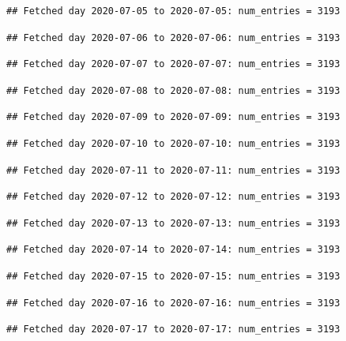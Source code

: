 \documentclass[]{article}
\begin{document}
\begin{verbatim}
## Fetched day 2020-07-05 to 2020-07-05: num_entries = 3193
\end{verbatim}

\begin{verbatim}
## Fetched day 2020-07-06 to 2020-07-06: num_entries = 3193
\end{verbatim}

\begin{verbatim}
## Fetched day 2020-07-07 to 2020-07-07: num_entries = 3193
\end{verbatim}

\begin{verbatim}
## Fetched day 2020-07-08 to 2020-07-08: num_entries = 3193
\end{verbatim}

\begin{verbatim}
## Fetched day 2020-07-09 to 2020-07-09: num_entries = 3193
\end{verbatim}

\begin{verbatim}
## Fetched day 2020-07-10 to 2020-07-10: num_entries = 3193
\end{verbatim}

\begin{verbatim}
## Fetched day 2020-07-11 to 2020-07-11: num_entries = 3193
\end{verbatim}

\begin{verbatim}
## Fetched day 2020-07-12 to 2020-07-12: num_entries = 3193
\end{verbatim}

\begin{verbatim}
## Fetched day 2020-07-13 to 2020-07-13: num_entries = 3193
\end{verbatim}

\begin{verbatim}
## Fetched day 2020-07-14 to 2020-07-14: num_entries = 3193
\end{verbatim}

\begin{verbatim}
## Fetched day 2020-07-15 to 2020-07-15: num_entries = 3193
\end{verbatim}

\begin{verbatim}
## Fetched day 2020-07-16 to 2020-07-16: num_entries = 3193
\end{verbatim}

\begin{verbatim}
## Fetched day 2020-07-17 to 2020-07-17: num_entries = 3193
\end{verbatim}
\end{document}
